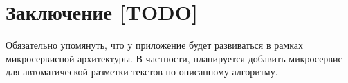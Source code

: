 \section*{Заключение [TODO]}

Обязательно упомянуть, что у приложение будет развиваться в рамках микросервисной архитектуры. В частности, планируется добавить микросервис для автоматической разметки текстов по описанному алгоритму.

%
%
%
%
%

\pagebreak